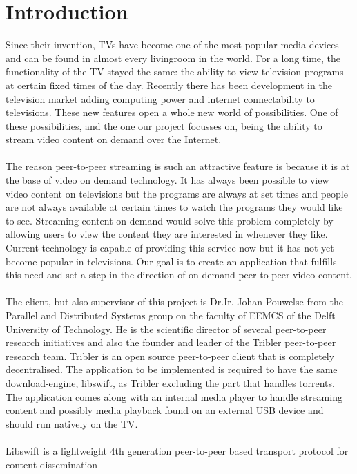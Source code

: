 \chapter{Introduction}
Since their invention, TV\textquotesingle s have become one of the most popular media devices and can be found in almost every livingroom in the world. For a long time, the functionality of the TV stayed the same: the ability to view television programs at certain fixed times of the day. Recently there has been development in the television market adding computing power and internet connectability to televisions. These new features open a whole new world of possibilities. One of these possibilities, and the one our project focusses on, being the ability to stream video content on demand over the Internet.
\\\\
The reason peer-to-peer streaming is such an attractive feature is because it is at the base of video on demand technology. It has always been possible to view video content on televisions but the programs are always at set times and people are not always available at certain times to watch the programs they would like to see. Streaming content on demand would solve this problem completely by allowing users to view the content they are interested in whenever they like. Current technology is capable of providing this service now but it has not yet become popular in televisions. Our goal is to create an application that fulfills this need and set a step in the direction of on demand peer-to-peer video content.
\\\\
The client, but also supervisor of this project is Dr.Ir. Johan Pouwelse from the Parallel and Distributed Systems group on the faculty of EEMCS of the Delft University of Technology.
He is the scientific director of several peer-to-peer research initiatives and also the founder and leader of the Tribler\cite{tribler} \cite{tribler2} peer-to-peer research team.
Tribler is an open source peer-to-peer client that is completely decentralised.
The application to be implemented is required to have the same download-engine, libswift,\cite{swift} as Tribler excluding the part that handles torrents.
The application comes along with an internal media player to handle streaming content and possibly media playback found on an external USB device and should run natively on the TV.
\\\\
Libswift is a lightweight 4th generation peer-to-peer based transport protocol for content dissemination
